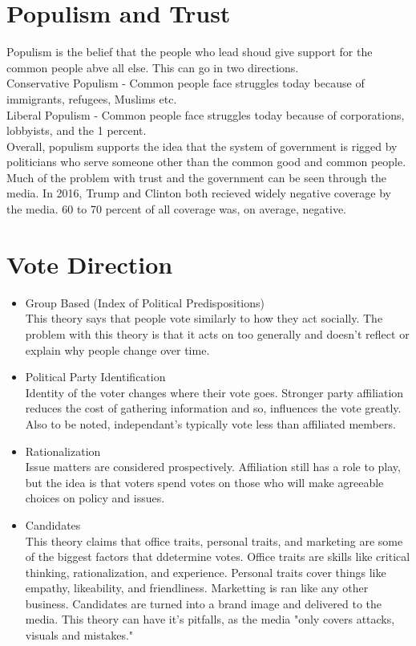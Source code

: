\documentclass{article}
\begin{document}
\section{Populism and Trust}
Populism is the belief that the people who lead shoud give support for the common people abve all else. This can go in two directions.\\
Conservative Populism - Common people face struggles today because of immigrants, refugees, Muslims etc.\\
Liberal Populism - Common people face struggles today because of corporations, lobbyists, and the 1 percent.\\

Overall, populism supports the idea that the system of government is rigged by politicians who serve someone other than the common good and common people. Much of the problem with trust and the government can be seen through the media. In 2016, Trump and Clinton both recieved widely negative coverage by the media. 60 to 70 percent of all coverage was, on average, negative.

\section{Vote Direction}
\begin{itemize}
  \item Group Based (Index of Political Predispositions)\\
  This theory says that people vote similarly to how they act socially. The problem with this theory is that it acts on too generally and doesn't reflect or explain why people change over time.
  \item Political Party Identification\\
  Identity of the voter changes where their vote goes. Stronger party affiliation reduces the cost of gathering information and so, influences the vote greatly. Also to be noted, independant's typically vote less than affiliated members.
  \item Rationalization\\
  Issue matters are considered prospectively. Affiliation still has a role to play, but the idea is that voters spend votes on those who will make agreeable choices on policy and issues.
  \item Candidates\\
  This theory claims that office traits, personal traits, and marketing are some of the biggest factors that ddetermine votes. Office traits are skills like critical thinking, rationalization, and experience. Personal traits cover things like empathy, likeability, and friendliness. Marketting is ran like any other business. Candidates are turned into a brand image and delivered to the media. This theory can have it's pitfalls, as the media "only covers attacks, visuals and mistakes."
\end{itemize}
\end{document}

